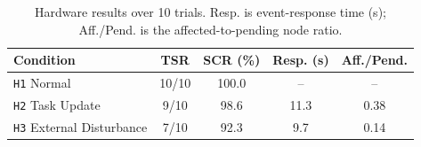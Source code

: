 \begin{table}[t]
  \centering
  \caption{Hardware results over 10 trials. Resp. is event-response time (s);
  Aff./Pend. is the affected-to-pending node ratio.}
  \label{tab:hardware_results}
  \small
  \setlength{\tabcolsep}{2.8pt}
  \begin{tabular}{lcccc}
    \toprule
    Condition & TSR & SCR (\%) & Resp. (s) & Aff./Pend. \\
    \midrule
    \texttt{H1} Normal
      & 10/10 & 100.0 & --   & --   \\
    \texttt{H2} Task Update
      & 9/10  & 98.6  & 11.3 & 0.38 \\
    \texttt{H3} External Disturbance
      & 7/10  & 92.3  & 9.7  & 0.14 \\
    \bottomrule
  \end{tabular}
\end{table}
